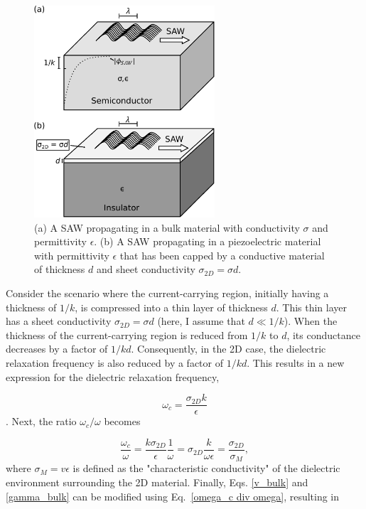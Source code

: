 \documentclass[double,12pt,1in,seploa]{beavtex}
\begin{document}
\begin{figure}
    \includegraphics[width = 0.6\textwidth]{SAW in thin film.pdf}
    \caption{(a) A SAW propagating in a bulk material with conductivity $\sigma$ and permittivity $\epsilon$. (b) A SAW propagating in a piezoelectric material with permittivity $\epsilon$ that has been capped by a conductive material of thickness $d$ and sheet conductivity $\sigma_{2D} = \sigma d$.}
    \label{SAW in thin film}
\end{figure}

Consider the scenario where the current-carrying region, initially having a thickness of $1/k$, is compressed into a thin layer of thickness $d$. This thin layer has a sheet conductivity $\sigma_{2D} = \sigma d$ (here, I assume that $d \ll 1/k$). When the thickness of the current-carrying region is reduced from $1/k$ to $d$, its conductance decreases by a factor of $1/kd$. Consequently, in the 2D case, the dielectric relaxation frequency is also reduced by a factor of $1/kd$. This results in a new expression for the dielectric relaxation frequency, 

\begin{equation}
    \omega_c = \frac{\sigma_{2D}k}{\epsilon}
\end{equation}. 
Next, the ratio $\omega_c/\omega$ becomes

\begin{equation}
    \frac{\omega_c}{\omega} = \frac{k\sigma_{2D}}{\epsilon}\frac{1}{\omega} = \sigma_{2D}\frac{k}{\omega \epsilon} = \frac{\sigma_{2D}}{\sigma_M}, \label{omega_c div omega}
\end{equation}
where $\sigma_M = v \epsilon$ is defined as the "characteristic conductivity" of the dielectric environment surrounding the 2D material. Finally, Eqs. \ref{v_bulk} and \ref{gamma_bulk} can be modified using Eq.\ \ref{omega_c div omega}, resulting in 
\end{document}
